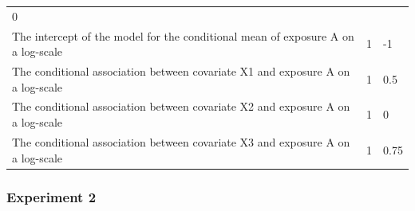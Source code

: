 \documentclass[10,a4paperpaper,]{article}
\begin{document}
\begin{longtable}[]{@{}lll@{}}
\begin{minipage}[t]{0.43\columnwidth}
0\strut
\end{minipage}\tabularnewline
\begin{minipage}[t]{0.37\columnwidth}\raggedright
The intercept of the model for the conditional mean of exposure A on a
log-scale\strut
\end{minipage} & \begin{minipage}[t]{0.12\columnwidth}\raggedright
1\strut
\end{minipage} & \begin{minipage}[t]{0.43\columnwidth}\raggedright
-1\strut
\end{minipage}\tabularnewline
\begin{minipage}[t]{0.37\columnwidth}\raggedright
The conditional association between covariate X1 and exposure A on a
log-scale\strut
\end{minipage} & \begin{minipage}[t]{0.12\columnwidth}\raggedright
1\strut
\end{minipage} & \begin{minipage}[t]{0.43\columnwidth}\raggedright
0.5\strut
\end{minipage}\tabularnewline
\begin{minipage}[t]{0.37\columnwidth}\raggedright
The conditional association between covariate X2 and exposure A on a
log-scale\strut
\end{minipage} & \begin{minipage}[t]{0.12\columnwidth}\raggedright
1\strut
\end{minipage} & \begin{minipage}[t]{0.43\columnwidth}\raggedright
0\strut
\end{minipage}\tabularnewline
\begin{minipage}[t]{0.37\columnwidth}\raggedright
The conditional association between covariate X3 and exposure A on a
log-scale\strut
\end{minipage} & \begin{minipage}[t]{0.12\columnwidth}\raggedright
1\strut
\end{minipage} & \begin{minipage}[t]{0.43\columnwidth}\raggedright
0.75\strut
\end{minipage}\tabularnewline
\bottomrule
\end{longtable}

\subsubsection{Experiment 2}
\end{document}
